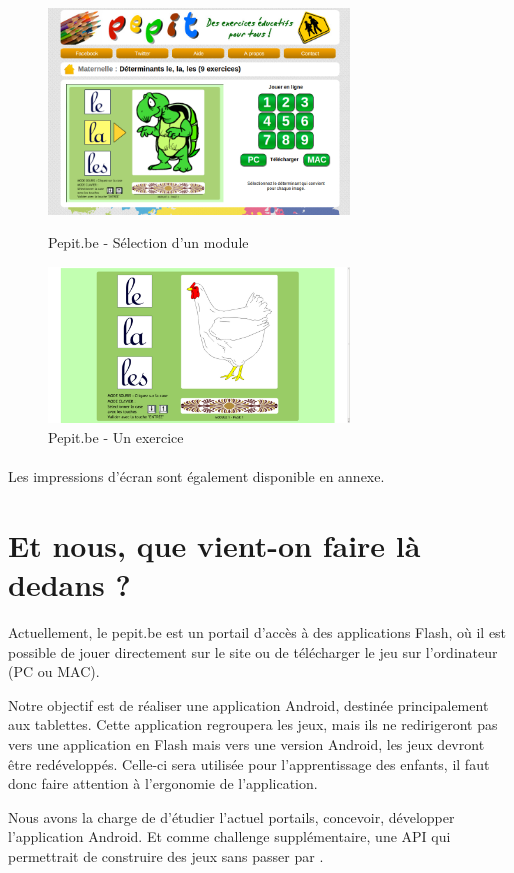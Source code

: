\begin{figure}[H]
	\begin{minipage}[c]{.46\linewidth}
		\includegraphics[width=8cm]{images/pepit_be_modules}
		\caption{Pepit.be - Sélection d'un module}
		\label{Pepit.be - Sélection d'un module}
   	\end{minipage} \hfill
   	\begin{minipage}[c]{.46\linewidth}
      	\includegraphics[width=8cm]{images/pepit_be_practice}
		\caption{Pepit.be - Un exercice}
		\label{Pepit.be - Un exercice}
   	\end{minipage}
\end{figure}

\paragraph{}Les impressions d'écran sont également disponible en annexe.

\section{Et nous, que vient-on faire là dedans ?}
Actuellement, le pepit.be est un portail d'accès à des applications Flash, où il est possible de jouer directement sur le site ou de télécharger le jeu sur l'ordinateur (PC ou MAC).


Notre objectif est de réaliser une application Android, destinée principalement aux tablettes. Cette application regroupera les jeux, mais ils ne redirigeront pas vers une application en Flash mais vers une version Android, les jeux devront être redéveloppés. Celle-ci sera utilisée pour l'apprentissage des enfants, il faut donc faire attention à l'ergonomie de l'application.


Nous avons la charge de d'étudier l'actuel portails, concevoir, développer l'application Android. Et comme challenge supplémentaire, une API qui permettrait de construire des jeux sans passer par \java{}.